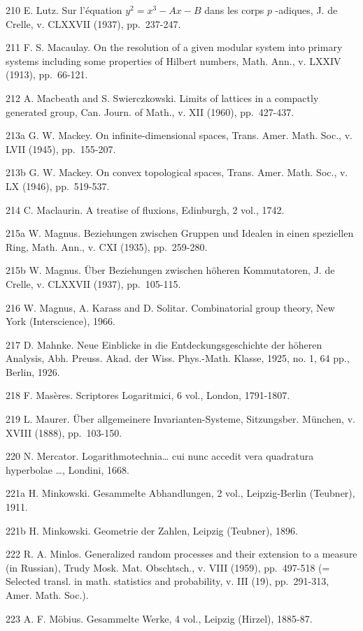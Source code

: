 210 E. Lutz. Sur l'équation \(y^{2} = x^{3} - Ax - B\) dans les corps \(p\) -adiques, J. de Crelle, v. CLXXVII (1937), pp.~237-247.

211 F. S. Macaulay. On the resolution of a given modular system into primary systems including some properties of Hilbert numbers, Math. Ann., v. LXXIV (1913), pp.~66-121.

212 A. Macbeath and S. Swierczkowski. Limits of lattices in a compactly generated group, Can. Journ. of Math., v. XII (1960), pp.~427-437.

213a G. W. Mackey. On infinite-dimensional spaces, Trans. Amer. Math. Soc., v. LVII (1945), pp.~155-207.

213b G. W. Mackey. On convex topological spaces, Trans. Amer. Math. Soc., v. LX (1946), pp.~519-537.

214 C. Maclaurin. A treatise of fluxions, Edinburgh, 2 vol., 1742.

215a W. Magnus. Beziehungen zwischen Gruppen und Idealen in einen speziellen Ring, Math. Ann., v. CXI (1935), pp.~259-280.

215b W. Magnus. Über Beziehungen zwischen höheren Kommutatoren, J. de Crelle, v. CLXXVII (1937), pp.~105-115.

216 W. Magnus, A. Karass and D. Solitar. Combinatorial group theory, New York (Interscience), 1966.

217 D. Mahnke. Neue Einblicke in die Entdeckungsgeschichte der höheren Analysis, Abh. Preuss. Akad. der Wiss. Phys.-Math. Klasse, 1925, no. 1, 64 pp., Berlin, 1926.

218 F. Masères. Scriptores Logaritmici, 6 vol., London, 1791-1807.

219 L. Maurer. Über allgemeinere Invarianten-Systeme, Sitzungsber. München, v. XVIII (1888), pp.~103-150.

220 N. Mercator. Logarithmotechnia\ldots{} cui nunc accedit vera quadratura hyperbolae \ldots, Londini, 1668.

221a H. Minkowski. Gesammelte Abhandlungen, 2 vol., Leipzig-Berlin (Teubner), 1911.

221b H. Minkowski. Geometrie der Zahlen, Leipzig (Teubner), 1896.

222 R. A. Minlos. Generalized random processes and their extension to a measure (in Russian), Trudy Mosk. Mat. Obschtsch., v. VIII (1959), pp.~497-518 (= Selected transl. in math. statistics and probability, v. III (19), pp.~291-313, Amer. Math. Soc.).

223 A. F. Möbius. Gesammelte Werke, 4 vol., Leipzig (Hirzel), 1885-87.

